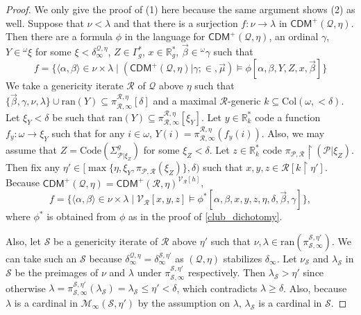 \documentclass{amsart}
\renewcommand{\subset}{\subseteq}
\newcommand{\uphar}{\mathbin{\upharpoonright}}
\begin{document}
\begin{proof}
We only give the proof of (1) here because the same argument shows (2) as well.
Suppose that $\nu<\lambda$ and that there is a surjection $f\colon\nu\to\lambda$ in $\mathsf{CDM}^{+}(\mathcal{Q}, \eta)$.
Then there are a formula $\phi$ in the language for $\mathsf{CDM}^+(\mathcal{Q}, \eta)$, an ordinal $\gamma$, $Y\in {}^{\omega}\xi$ for some $\xi<\delta^{\mathcal{Q}, \eta}_{\infty}$, $Z\in\Gamma^*_g$, $x\in\mathbb{R}^*_g$, $\vec{\beta}\in{}^{\omega}\gamma$ such that
\[
f=\{\langle\alpha, \beta\rangle\in\nu\times\lambda\mid(\mathsf{CDM}^+(\mathcal{Q}, \eta)\vert\gamma; {\in}, \vec{\mu})\models\phi[\alpha, \beta, Y, Z, x, \vec{\beta}]\}
\]
We take a genericity iterate $\mathcal{R}$ of $\mathcal{Q}$ above $\eta$ such that $\{\vec{\beta}, \gamma, \nu, \lambda\}\cup\mathrm{ran}(Y)\subset\pi^{\mathcal{R}, \eta}_{\mathcal{R}, \infty}[\delta]$ and a maximal $\mathcal{R}$-generic $k\subset\mathrm{Col}(\omega, {<}\delta)$.
Let $\xi_Y<\delta$ be such that $\mathrm{ran}(Y)\subset\pi^{\mathcal{R}, \eta}_{\mathcal{R}, \infty}[\xi_Y]$.
Let $y\in\mathbb{R}^*_{k}$ code a function $f_y\colon\omega\to\xi_Y$ such that for any $i\in\omega$, $Y(i)=\pi^{\mathcal{R}, \eta}_{\mathcal{R}, \infty}(f_y(i))$.
Also, we may assume that $Z=\mathrm{Code}(\Sigma^g_{\mathcal{P}\vert\xi_{Z}})$ for some $\xi_Z<\delta$.
Let $z\in\mathbb{R}^*_{k}$ code $\pi_{\mathcal{P}, \mathcal{R}}\uphar(\mathcal{P}\vert\xi_Z)$.
Then fix any $\eta'\in[\max\{\eta, \xi_Y, \pi_{\mathcal{P}, \mathcal{R}}(\xi_Z)\}, \delta)$ such that $x, y, z\in\mathcal{R}[k\uphar\eta']$.
Because $\mathsf{CDM}^+(\mathcal{Q}, \eta)=\mathsf{CDM}^+(\mathcal{R}, \eta)^{\mathcal{V}_{\mathcal{R}}[h]}$,
\[
f=\{\langle\alpha, \beta\rangle\in\nu\times\lambda\mid\mathcal{V}_{\mathcal{R}}[x, y, z]\models\phi^*[\alpha, \beta, x, y, z, \eta, \delta, \vec{\beta}, \gamma]\},
\]
where $\phi^*$ is obtained from $\phi$ as in the proof of \cref{club_dichotomy}.

Also, let $\mathcal{S}$ be a genericity iterate of $\mathcal{R}$ above $\eta'$ such that $\nu, \lambda\in\mathrm{ran}(\pi^{\mathcal{S}, \eta'}_{\mathcal{S}, \infty})$.
We can take such an $\mathcal{S}$ because $\delta^{\mathcal{Q}, \eta}_{\infty}=\delta^{\mathcal{S}, \eta'}_{\infty}$ as $(\mathcal{Q}, \eta)$ stabilizes $\delta_{\infty}$.
Let $\nu_{\mathcal{S}}$ and $\lambda_{\mathcal{S}}$ in $\mathcal{S}$ be the preimages of $\nu$ and $\lambda$ under $\pi^{\mathcal{S}, \eta'}_{\mathcal{S}, \infty}$ respectively.
Then $\lambda_{\mathcal{S}}>\eta'$ since otherwise $\lambda=\pi^{\mathcal{S}, \eta'}_{\mathcal{S}, \infty}(\lambda_{\mathcal{S}})=\lambda_{\mathcal{S}}\leq\eta'<\delta$, which contradicts $\lambda\geq\delta$.
Also, because $\lambda$ is a cardinal in $\mathcal{M}_{\infty}(\mathcal{S}, \eta')$ by the assumption on $\lambda$, $\lambda_{\mathcal{S}}$ is a cardinal in $\mathcal{S}$.


\end{proof}
\end{document}
